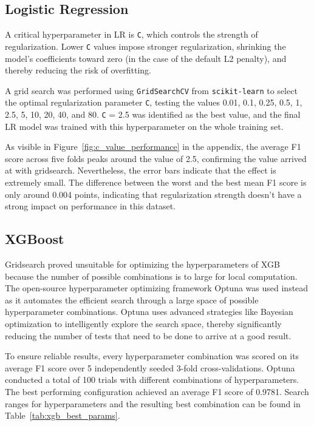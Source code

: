\documentclass[twocolumn]{article}
\begin{document}
\subsection{Logistic Regression}

A critical hyperparameter in LR is \texttt{C}, which controls the strength of regularization. Lower \texttt{C} values impose stronger regularization, shrinking the model's coefficients toward zero (in the case of the default L2 penalty), and thereby reducing the risk of overfitting.

A grid search was performed using \texttt{GridSearchCV} from \texttt{scikit-learn} to select the optimal regularization parameter \texttt{C}, testing the values 0.01, 0.1, 0.25, 0.5, 1, 2.5, 5, 10, 20, 40, and 80. \texttt{C} = 2.5 was identified as the best value, and the final LR model was trained with this hyperparameter on the whole training set.

As visible in Figure~\ref{fig:c_value_performance} in the appendix, the average F1 score across five folds peaks around the value of 2.5, confirming the value arrived at with gridsearch. Nevertheless, the error bars indicate that the effect is extremely small. The difference between the worst and the best mean F1 score is only around 0.004 points, indicating that regularization strength doesn't have a strong impact on performance in this dataset.

\subsection{XGBoost}

Gridsearch proved unsuitable for optimizing the hyperparameters of XGB because the number of possible combinations is to large for local computation. The open-source hyperparameter optimizing framework Optuna \parencite{akibaOptunaNextgenerationHyperparameter2019} was used instead as it automates the efficient search through a large space of possible hyperparameter combinations. Optuna uses advanced strategies like Bayesian optimization to intelligently explore the search space, thereby significantly reducing the number of tests that need to be done to arrive at a good result.

To ensure reliable results, every hyperparameter combination was scored on its average F1 score over 5 independently seeded 3-fold cross-validations. Optuna conducted a total of 100 trials with different combinations of hyperparameters. The best performing configuration achieved an average F1 score of 0.9781. Search ranges for hyperparameters and the resulting best combination can be found in Table~\ref{tab:xgb_best_params}.
\end{document}
